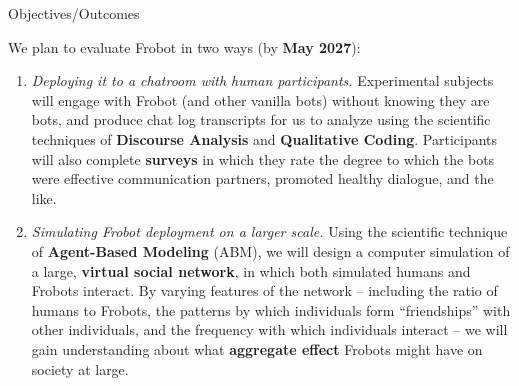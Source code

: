 \documentclass[12pt]{beamer}
\begin{document}
\begin{frame}[c]{Objectives/Outcomes}

\small
We plan to evaluate Frobot in two ways (by \textbf{May 2027}):
\footnotesize

\begin{enumerate}
\itemsep.5em
\item \textsl{Deploying it to a chatroom with human participants.} Experimental subjects will engage with Frobot (and other vanilla bots) without knowing they are bots, and produce chat log transcripts for us to analyze using the scientific techniques of \textbf{Discourse Analysis} and \textbf{Qualitative Coding}. Participants will also complete \textbf{surveys} in which they rate the degree to which the bots were effective communication partners, promoted healthy dialogue, and the like.

\item \textsl{Simulating Frobot deployment on a larger scale.} Using the scientific technique of \textbf{Agent-Based Modeling} (ABM), we will design a computer simulation of a large, \textbf{virtual social network}, in which both simulated humans and Frobots interact. By varying features of the network -- including the ratio of humans to Frobots, the patterns by which individuals form ``friendships'' with other individuals, and the frequency with which individuals interact -- we will gain understanding about what \textbf{aggregate effect} Frobots might have on society at large.
\end{enumerate}


\end{frame}
\end{document}
